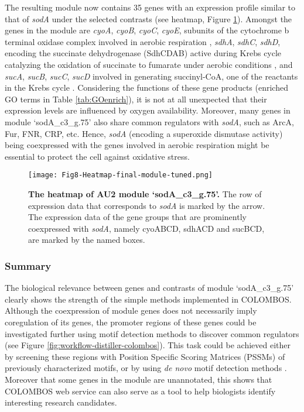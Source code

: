 The resulting module now contains 35 genes with an expression profile similar
to that of \textit{sodA} under the selected contrasts (see heatmap, Figure
\ref{fig:colombos-heatmap-final}).  Amongst the genes in the module are
\textit{cyoA}, \textit{cyoB}, \textit{cyoC}, \textit{cyoE}, subunits of the
cytochrome b terminal oxidase complex involved in aerobic respiration
\cite{Cotter1992}, \textit{sdhA}, \textit{sdhC}, \textit{sdhD}, encoding the
succinate dehydrogenase (SdhCDAB) active during Krebs cycle catalyzing the
oxidation of succinate to fumarate under aerobic conditions \cite{Wilde1986},
and \textit{sucA}, \textit{sucB}, \textit{sucC}, \textit{sucD} involved in
generating succinyl-CoA, one of the reactants in the Krebs cycle
\cite{Buck1989}.  
%
Considering the functions of these gene products (enriched GO terms in Table
\ref{tab:GOenrich}), it is not at all unexpected that their expression levels
are influenced by oxygen availability.  Moreover, many genes in module
`sodA\_c3\_g.75' also share common regulators with \textit{sodA}, such as
ArcA, Fur, FNR, CRP, etc. Hence, \textit{sodA} (encoding a superoxide
dismutase activity) being coexpressed with the genes involved in aerobic
respiration might be essential to protect the cell against oxidative stress.
%
\begin{figure}[tb]
	\centering
  	\texttt{[image: Fig8-Heatmap-final-module-tuned.png]}
	\caption[COLOMBOS heatmap of module `sodA\_c3\_g.75']{
	\textbf{The heatmap of AU2 module `sodA\_c3\_g.75'.}
	The row of expression data that corresponds to \textit{sodA} is
	marked by the arrow. The expression data of the gene groups that are 
	prominently coexpressed with \textit{sodA}, namely cyoABCD, sdhACD and 
	sucBCD, are marked by the named boxes.}
	\label{fig:colombos-heatmap-final}
\end{figure}


\subsubsection{Summary}

The biological relevance between genes and contrasts of module
`sodA\_c3\_g.75' clearly shows the strength of the simple methods implemented
in COLOMBOS.
%
Although the coexpression of module genes does not necessarily imply
coregulation of its genes, 
%
the promoter regions of these genes could be investigated further using motif
detection methods to discover common regulators (see
Figure \ref{fig:workflow-distiller-colombos}).
%
This task could be achieved either by screening these regions with Position
Specific Scoring Matrices (PSSMs) of previously characterized motifs, or by
using \textit{de novo} motif detection methods \cite{Tompa2005, Storms2010}.
%
Moreover that some genes in the module are unannotated, this shows that
COLOMBOS web service can also serve as a tool to help biologists identify
interesting research candidates.





